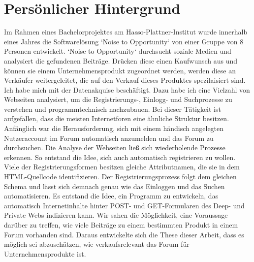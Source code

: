 \section{Persönlicher Hintergrund}
Im Rahmen eines Bachelorprojektes am Hasso-Plattner-Institut wurde innerhalb eines Jahres die Softwarelösung `Noise to Opportunity` von einer Gruppe von 8 Personen entwickelt. `Noise to Opportunity` durchsucht soziale Medien und analysiert die gefundenen Beiträge. Drücken diese einen Kaufwunsch aus und können sie einem Unternehmensprodukt zugeordnet werden, werden diese an Verkäufer weitergeleitet, die auf den Verkauf dieses Produktes spezilaisiert sind. Ich habe mich mit der Datenakquise beschäftigt. Dazu habe ich eine Vielzahl von Webseiten analysiert, um die Registrierungs-, Einlogg- und Suchprozesse zu verstehen und programmtechnisch nachzubauen. Bei dieser Tätigkeit ist aufgefallen, dass die meisten Internetforen eine ähnliche Struktur besitzen. Anfänglich war die Herausforderung, sich mit einem händisch angelegten Nutzeraccount im Forum automatisch anzumelden und das Forum zu durchsuchen. Die Analyse der Webseiten ließ sich wiederholende Prozesse erkennen. So entstand die Idee, sich auch automatisch registrieren zu wollen.
Viele der Registrierungsformen besitzen gleiche Attributnamen, die sie in dem HTML-Quellcode identifizieren. Der Registrierungsprozess folgt dem gleichen Schema und lässt sich demnach genau wie das Einloggen und das Suchen automatisieren. Es entstand die Idee, ein Programm zu entwickeln, das automatisch Internetinhalte hinter POST- und GET-Formularen des Deep- und Private Webs indizieren kann. Wir sahen die Möglichkeit, eine Voraussage darüber zu treffen, wie viele Beiträge zu einem bestimmten Produkt in einem Forum vorhanden sind.
Daraus entwickelte sich die These dieser Arbeit, dass es möglich sei abzuschätzen, wie verkaufsrelevant das Forum für Unternehmensprodukte ist.
\newpage